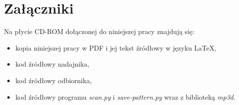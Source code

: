 \appendix
\chapter{Załączniki}

Na płycie CD-ROM dołączonej do niniejszej pracy znajdują się:
\begin{itemize}
 \item kopia niniejszej pracy w PDF i jej tekst źródłowy w języku \LaTeX,
 \item kod źródłowy nadajnika,
 \item kod źródłowy odbiornika,
 \item kod źródłowy programu \textit{scan.py} i \textit{save-pattern.py} wraz z biblioteką \textit{mp3d}.
\end{itemize}

